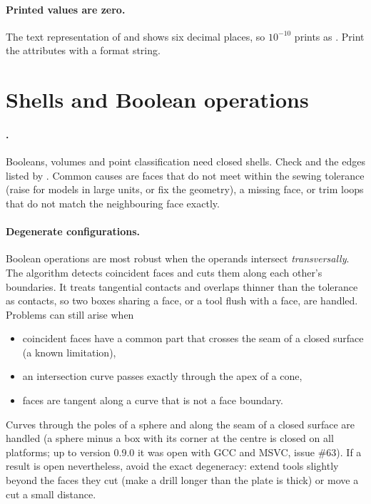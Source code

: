 \paragraph{Printed values are zero.}
The text representation of  and  shows six decimal places, so
$10^{-10}$ prints as . Print the attributes with a format string.

\section{Shells and Boolean operations}\label{sec:ts-booleans}

\paragraph{.}
Booleans, volumes and point classification need closed shells. Check
 and the edges listed by . Common causes are faces
that do not meet within the sewing tolerance (raise  for
models in large units, or fix the geometry), a missing face, or trim loops that do not match the
neighbouring face exactly.

\paragraph{Degenerate configurations.}
Boolean operations are most robust when the operands intersect \emph{transversally}. The
algorithm detects coincident faces and cuts them along each other's boundaries. It treats
tangential contacts and overlaps thinner than the tolerance as contacts, so two boxes sharing a
face, or a tool flush with a face, are handled. Problems can still arise when
\begin{itemize}
  \item coincident faces have a common part that crosses the seam of a closed surface (a known
    limitation),
  \item an intersection curve passes exactly through the apex of a cone,
  \item faces are tangent along a curve that is not a face boundary.
\end{itemize}
Curves through the poles of a sphere and along the seam of a closed surface are handled (a
sphere minus a box with its corner at the centre is closed on all platforms; up to version
0.9.0 it was open with GCC and MSVC, issue \#63). If a result is open nevertheless, avoid the
exact degeneracy: extend tools slightly beyond the faces they cut (make a drill longer than
the plate is thick) or move a cut a small distance.

